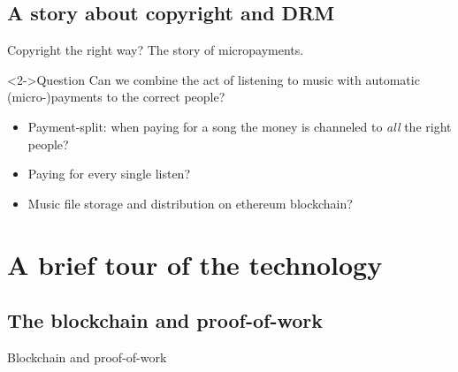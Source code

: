 \documentclass{beamer}
\begin{document}
\subsection[copyright]{A story about copyright and DRM}
\begin{frame}{Copyright the right way?}
The story of micropayments.
\begin{block}<2->{Question}
Can we combine the act of listening to music with automatic (micro-)payments to the correct people? 
\end{block}
\begin{itemize}
 \item<3->{Payment-split: when paying for a song the money is channeled to \textit{all} the right people? }
 \item<5->{Paying for every single listen? }
 \item<7->{Music file storage and distribution on ethereum blockchain?  }
\end{itemize}

\end{frame}


\section[tech]{A brief tour of the technology}

\subsection[blockchain]{The blockchain and proof-of-work}
\begin{frame}{Blockchain and proof-of-work}
\end{frame}
\end{document}
